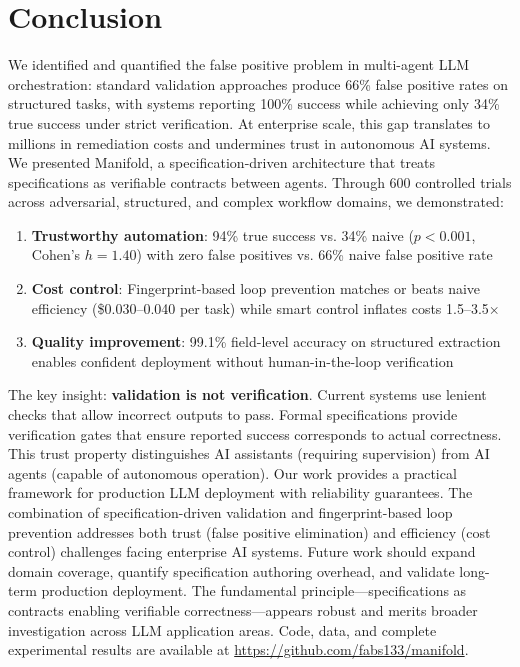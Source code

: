 \documentclass{article}
\begin{document}
\section{Conclusion}
We identified and quantified the false positive problem in multi-agent LLM orchestration: standard validation approaches produce 66\% false positive rates on structured tasks, with systems reporting 100\% success while achieving only 34\% true success under strict verification. At enterprise scale, this gap translates to millions in remediation costs and undermines trust in autonomous AI systems.
We presented Manifold, a specification-driven architecture that treats specifications as verifiable contracts between agents. Through 600 controlled trials across adversarial, structured, and complex workflow domains, we demonstrated:
\begin{enumerate}
\item \textbf{Trustworthy automation}: 94\% true success vs. 34\% naive ($p < 0.001$, Cohen's $h = 1.40$) with zero false positives vs. 66\% naive false positive rate
\item \textbf{Cost control}: Fingerprint-based loop prevention matches or beats naive efficiency (\$0.030--0.040 per task) while smart control inflates costs 1.5--3.5$\times$
\item \textbf{Quality improvement}: 99.1\% field-level accuracy on structured extraction enables confident deployment without human-in-the-loop verification
\end{enumerate}
The key insight: \textbf{validation is not verification}. Current systems use lenient checks that allow incorrect outputs to pass. Formal specifications provide verification gates that ensure reported success corresponds to actual correctness. This trust property distinguishes AI assistants (requiring supervision) from AI agents (capable of autonomous operation).
Our work provides a practical framework for production LLM deployment with reliability guarantees. The combination of specification-driven validation and fingerprint-based loop prevention addresses both trust (false positive elimination) and efficiency (cost control) challenges facing enterprise AI systems.
Future work should expand domain coverage, quantify specification authoring overhead, and validate long-term production deployment. The fundamental principle---specifications as contracts enabling verifiable correctness---appears robust and merits broader investigation across LLM application areas.
Code, data, and complete experimental results are available at \url{https://github.com/fabs133/manifold}.


\end{document}
